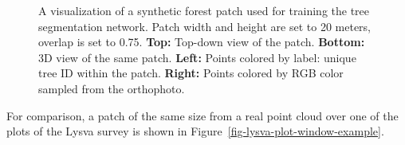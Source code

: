 \begin{figure}
\caption[Visualisation of a synthetic forest patch used for
training]{\label{fig-synthetic-forest-patch-example}A visualization of a
synthetic forest patch used for training the tree segmentation network.
Patch width and height are set to 20 meters, overlap is set to 0.75.
\textbf{Top:} Top-down view of the patch. \textbf{Bottom:} 3D view of
the same patch. \textbf{Left:} Points colored by label: unique tree ID
within the patch. \textbf{Right:} Points colored by RGB color sampled
from the orthophoto.}
\end{figure}

For comparison, a patch of the same size from a real point cloud over one of the plots of the Lysva survey is shown in Figure~\ref{fig-lysva-plot-window-example}.

